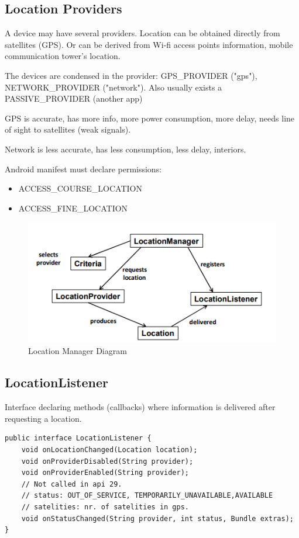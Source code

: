 \subsection{Location Providers}

A device may have several providers. Location can be obtained directly from satellites 
(GPS). Or can be derived from Wi-fi access points information, mobile communication tower's location. 

The devices are condensed in the provider: GPS\_PROVIDER ("gps"), NETWORK\_PROVIDER ("network").
Also usually exists a PASSIVE\_PROVIDER (another app) 

GPS is accurate, has more info, more power consumption, more delay,
needs line of sight to satellites (weak signals). 

Network is less accurate, has less consumption, less delay, interiors.

Android manifest must declare permissions:

\begin{itemize}
    \item ACCESS\_COURSE\_LOCATION
    \item ACCESS\_FINE\_LOCATION
\end{itemize}

\begin{figure}[h]
\centering
\includegraphics[width=0.9\linewidth]{figures/07_location_manager_diagram.png}
\caption{Location Manager Diagram}
\label{fig:location_manager_diagram}
\end{figure}


\subsection{LocationListener} 
Interface declaring methods (callbacks) where information is delivered
after requesting a location. 

\begin{lstlisting}[title=LocationListener interface]
public interface LocationListener {
    void onLocationChanged(Location location);
    void onProviderDisabled(String provider);
    void onProviderEnabled(String provider);
    // Not called in api 29.
    // status: OUT_OF_SERVICE, TEMPORARILY_UNAVAILABLE,AVAILABLE
    // satelities: nr. of satelities in gps. 
    void onStatusChanged(String provider, int status, Bundle extras);
}
\end{lstlisting}

